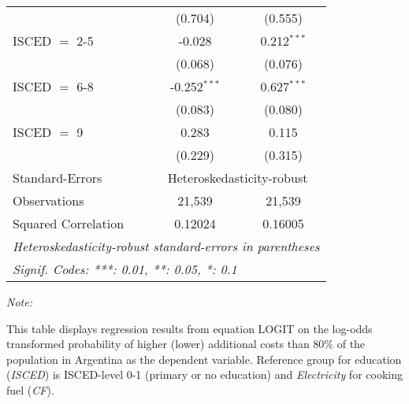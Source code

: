 \begin{table}[htbp!]
\begin{adjustbox}{width = 1\textwidth, max height = 0.95\textheight, center}
\begin{threeparttable}[b]
\begin{tabular}{lcc}
                                 & (0.704)        & (0.555)\\   
            ISCED $=$ 2-5        & -0.028         & 0.212$^{***}$\\   
                                 & (0.068)        & (0.076)\\   
            ISCED $=$ 6-8        & -0.252$^{***}$ & 0.627$^{***}$\\   
                                 & (0.083)        & (0.080)\\   
            ISCED $=$ 9          & 0.283          & 0.115\\   
                                 & (0.229)        & (0.315)\\   
            \midrule 
            Standard-Errors & \multicolumn{2}{c}{Heteroskedasticity-robust} \\ 
            Observations         & 21,539         & 21,539\\  
            Squared Correlation  & 0.12024        & 0.16005\\  
            \midrule \midrule
            \multicolumn{3}{l}{\emph{Heteroskedasticity-robust standard-errors in parentheses}}\\
            \multicolumn{3}{l}{\emph{Signif. Codes: ***: 0.01, **: 0.05, *: 0.1}}\\
         \end{tabular}
         
         \begin{tablenotes}\item \medskip \textit{Note:}
            \item This table displays regression results from equation LOGIT on the log-odds transformed probability of higher (lower) additional costs than 80\% of the population in Argentina as the dependent variable. Reference group for education (\textit{ISCED}) is ISCED-level 0-1 (primary or no education) and \textit{Electricity} for cooking fuel (\textit{CF}).
         \end{tablenotes}
      \end{threeparttable}
   \end{adjustbox}
\end{table}


